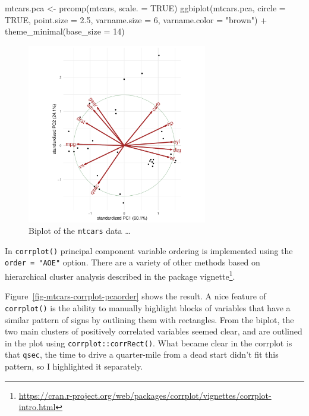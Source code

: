 \documentclass[
  letterpaper,
  10pt,
  krantz2]{krantz}
\makeatletter
\newenvironment{Shaded}{\begin{snugshade}}{\end{snugshade}}
\newcommand{\AttributeTok}[1]{\textcolor[rgb]{0.40,0.45,0.13}{#1}}
\newcommand{\ConstantTok}[1]{\textcolor[rgb]{0.56,0.35,0.01}{#1}}
\newcommand{\DecValTok}[1]{\textcolor[rgb]{0.68,0.00,0.00}{#1}}
\newcommand{\FloatTok}[1]{\textcolor[rgb]{0.68,0.00,0.00}{#1}}
\newcommand{\FunctionTok}[1]{\textcolor[rgb]{0.28,0.35,0.67}{#1}}
\newcommand{\NormalTok}[1]{\textcolor[rgb]{0.00,0.23,0.31}{#1}}
\newcommand{\OtherTok}[1]{\textcolor[rgb]{0.00,0.23,0.31}{#1}}
\newcommand{\SpecialCharTok}[1]{\textcolor[rgb]{0.37,0.37,0.37}{#1}}
\newcommand{\StringTok}[1]{\textcolor[rgb]{0.13,0.47,0.30}{#1}}
\providecommand{\href}[2]{#2\footnote{\url{#1}}}
\newenvironment{kframe}{%
  \medskip{}
  \setlength{\fboxsep}{.8em}
  \def\at@end@of@kframe{}%
  \ifinner\ifhmode%
  \def\at@end@of@kframe{\end{minipage}}%
  \begin{minipage}{\columnwidth}%
  \fi\fi%
  \def\FrameCommand##1{\hskip\@totalleftmargin \hskip-\fboxsep
  \colorbox{shadecolor}{##1}\hskip-\fboxsep
      \hskip-\linewidth \hskip-\@totalleftmargin \hskip\columnwidth}%
  \MakeFramed {\advance\hsize-\width
    \@totalleftmargin\z@ \linewidth\hsize
    \@setminipage}}%
{\par\unskip\endMakeFramed%
  \at@end@of@kframe}
\renewenvironment{Shaded}{\begin{kframe}}{\end{kframe}}
\makeatother
\begin{document}
\begin{Shaded}
\begin{Highlighting}[]
\NormalTok{mtcars.pca }\OtherTok{\textless{}{-}} \FunctionTok{prcomp}\NormalTok{(mtcars, }\AttributeTok{scale. =} \ConstantTok{TRUE}\NormalTok{)}
\FunctionTok{ggbiplot}\NormalTok{(mtcars.pca,}
         \AttributeTok{circle =} \ConstantTok{TRUE}\NormalTok{,}
         \AttributeTok{point.size =} \FloatTok{2.5}\NormalTok{,}
         \AttributeTok{varname.size =} \DecValTok{6}\NormalTok{,}
         \AttributeTok{varname.color =} \StringTok{"brown"}\NormalTok{) }\SpecialCharTok{+}
  \FunctionTok{theme\_minimal}\NormalTok{(}\AttributeTok{base\_size =} \DecValTok{14}\NormalTok{) }
\end{Highlighting}
\end{Shaded}

\begin{figure}[H]

{\centering \includegraphics[width=0.7\textwidth,height=\textheight]{figs/ch04/fig-mtcars-biplot-1.pdf}

}

\caption{\label{fig-mtcars-biplot}Biplot of the \texttt{mtcars} data
\ldots{}}

\end{figure}

In \texttt{corrplot()} principal component variable ordering is
implemented using the \texttt{order\ =\ "AOE"} option. There are a
variety of other methods based on hierarchical cluster analysis
described in the
\href{https://cran.r-project.org/web/packages/corrplot/vignettes/corrplot-intro.html}{package
vignette}.

Figure~\ref{fig-mtcars-corrplot-pcaorder} shows the result. A nice
feature of \texttt{corrplot()} is the ability to manually highlight
blocks of variables that have a similar pattern of signs by outlining
them with rectangles. From the biplot, the two main clusters of
positively correlated variables seemed clear, and are outlined in the
plot using \texttt{corrplot::corrRect()}. What became clear in the
corrplot is that \texttt{qsec}, the time to drive a quarter-mile from a
dead start didn't fit this pattern, so I highlighted it separately.
\end{document}
